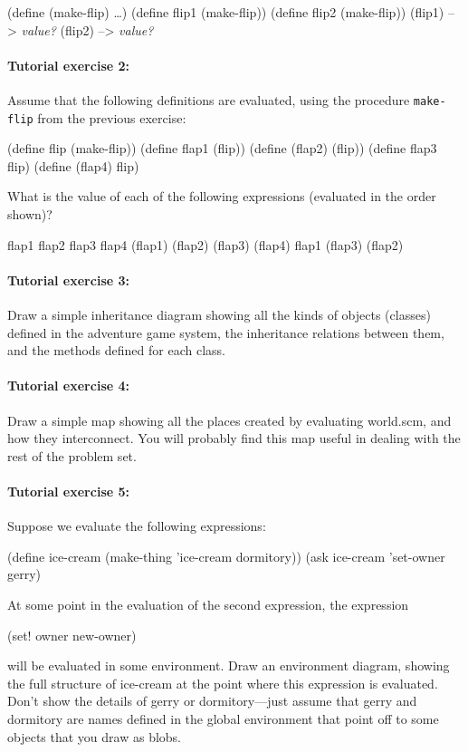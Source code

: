 \beginlisp
(define (make-flip) \ldots{})
(define flip1 (make-flip))
(define flip2 (make-flip))
\null
(flip1) --> {\em value?}
(flip2) --> {\em value?}
\endlisp

\paragraph{Tutorial exercise 2:}

Assume that the following definitions are evaluated, using
the procedure {\tt make-flip} from the previous exercise:

\beginlisp
(define flip (make-flip))
(define flap1 (flip))
(define (flap2) (flip))
(define flap3 flip)
(define (flap4) flip)
\endlisp

\noindent What is the value of each of the following expressions (evaluated
in the order shown)?

\beginlisp
flap1
\null
flap2
\null
flap3
\null
flap4
\null
(flap1)
\null
(flap2)
\null
(flap3)
\null
(flap4)
\null
flap1
\null
(flap3)
\null
(flap2)
\endlisp

\paragraph{Tutorial exercise 3:} Draw a simple inheritance diagram
showing all the kinds of objects (classes) defined in the adventure
game system, the inheritance relations between them, and the methods
defined for each class.

\paragraph{Tutorial exercise 4:} Draw a simple map showing all the
places created by evaluating {\cf world.scm}, and how they
interconnect.  You will probably find this map useful in dealing with
the rest of the problem set.

\paragraph{Tutorial exercise 5:} Suppose we evaluate the following
expressions:

\beginlisp
(define ice-cream (make-thing 'ice-cream dormitory))
(ask ice-cream 'set-owner gerry)
\endlisp

\noindent
At some point in the evaluation of the second expression, the expression

\beginlisp
(set! owner new-owner)
\endlisp

\noindent
will be evaluated in some environment.  Draw an environment
diagram, showing the full structure of {\cf ice-cream} at the point where
this expression is evaluated.  Don't show the details of {\cf gerry}
or {\cf dormitory}---just assume that {\cf gerry} and {\cf dormitory}
are names defined in the global environment that point off to some
objects that you draw as blobs.

